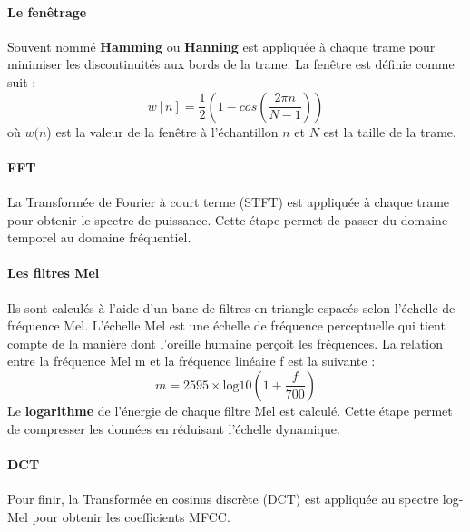 \documentclass[a4paper,11pt]{article}
\begin{document}
\paragraph{Le fenêtrage}
Souvent nommé \textbf{Hamming} ou \textbf{Hanning} est appliquée à chaque trame pour minimiser les discontinuités aux bords de la trame. La fenêtre est définie comme suit :
\[
w[n] = \frac{1}{2}(1 - cos(\frac{2 \pi n}{N - 1}))
\]
où $w(n$) est la valeur de la fenêtre à l'échantillon $n$ et $N$ est la taille de la trame.
\paragraph{FFT}
La Transformée de Fourier à court terme (STFT) est appliquée à chaque trame pour obtenir le spectre de puissance. Cette étape permet de passer du domaine temporel au domaine fréquentiel. 
\paragraph{Les filtres Mel}
Ils sont calculés à l'aide d'un banc de filtres en triangle espacés selon l'échelle de fréquence Mel. L'échelle Mel est une échelle de fréquence perceptuelle qui tient compte de la manière dont l'oreille humaine perçoit les fréquences. La relation entre la fréquence Mel m et la fréquence linéaire f est la suivante :
\[
m = 2595 \times \text{log}10(1 + \frac{f}{700})
\]
Le \textbf{logarithme} de l'énergie de chaque filtre Mel est calculé. Cette étape permet de compresser les données en réduisant l'échelle dynamique.
\paragraph{DCT}
Pour finir, la Transformée en cosinus discrète (DCT) est appliquée au spectre log-Mel pour obtenir les coefficients MFCC.
\end{document}
